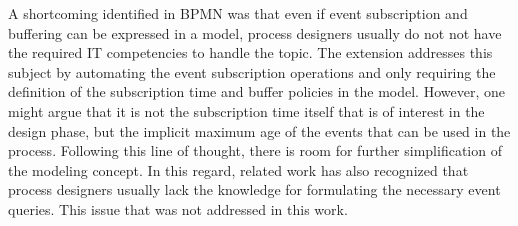 A shortcoming identified in BPMN was that even if event subscription and buffering can be expressed in a model, process designers usually do not not have the required IT competencies to handle the topic.
The extension addresses this subject by automating the event subscription operations and only requiring the definition of the subscription time and buffer policies in the model.
However, one might argue that it is not the subscription time itself that is of interest in the design phase, but the implicit maximum age of the events that can be used in the process. Following this line of thought, there is room for further simplification of the modeling concept.
In this regard, related work has also recognized that process designers usually lack the knowledge for formulating the necessary event queries. This issue that was not addressed in this work.











